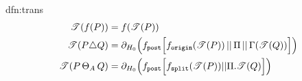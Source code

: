 \documentclass[../hons_project.tex]{subfiles}
\begin{document}
\begin{dfn}{dfn:trans}{}
\begin{align*}
		\mathscr{T}(f(P))           & = f(\mathscr{T}(P))                                                                                                                                                                               \\
		\mathscr{T}(P \triangle Q) & = \partial_{H_{0}}\Bigl(f_{\mathtt{post}}\Bigl[ f_{\mathtt{origin}}(\mathscr{T}(P)) \,\vert\vert\, \Pi \,\vert\vert\, \Gamma(\mathscr{T}(Q)) \Bigr]\Bigr)                                                              \\
		\mathscr{T}(P \,\Theta_{A}\, Q)     & = \partial_{H_{0}}\Bigl(f_{\mathtt{post}} \Bigl[ f_{\mathtt{split}}(\mathscr{T}(P)) | | \Pi.\mathscr{T}(Q) \Bigr]\Bigr)
	\end{align*}
\end{dfn}
\end{document}
